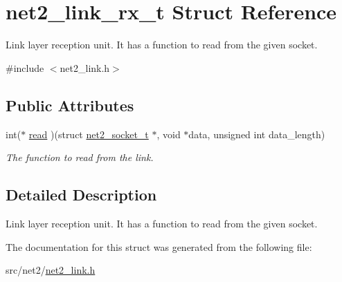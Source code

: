 \hypertarget{structnet2__link__rx__t}{\section{net2\-\_\-link\-\_\-rx\-\_\-t Struct Reference}
\label{structnet2__link__rx__t}
}


Link layer reception unit. It has a function to read from the given socket.  




{\ttfamily \#include $<$net2\-\_\-link.\-h$>$}

\subsection*{Public Attributes}
\begin{DoxyCompactItemize}
\item 
\hypertarget{structnet2__link__rx__t_a4cf71287a067a11d18e3e8deb7fd5f9d}{int($\ast$ \hyperlink{structnet2__link__rx__t_a4cf71287a067a11d18e3e8deb7fd5f9d}{read} )(struct \hyperlink{structnet2__socket__t}{net2\-\_\-socket\-\_\-t} $\ast$, void $\ast$data, unsigned int data\-\_\-length)}\label{structnet2__link__rx__t_a4cf71287a067a11d18e3e8deb7fd5f9d}

\begin{DoxyCompactList}\small\item\em The function to read from the link. \end{DoxyCompactList}\end{DoxyCompactItemize}


\subsection{Detailed Description}
Link layer reception unit. It has a function to read from the given socket. 

The documentation for this struct was generated from the following file\-:\begin{DoxyCompactItemize}
\item 
src/net2/\hyperlink{net2__link_8h}{net2\-\_\-link.\-h}\end{DoxyCompactItemize}
